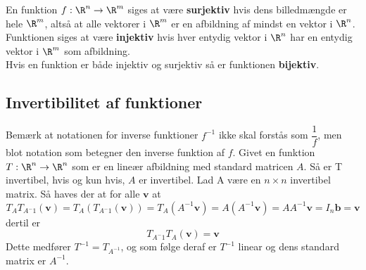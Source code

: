 
\begin{defn}{}{}
En funktion $f:\R^n \rightarrow \R^m$ siges at være \textbf{surjektiv} hvis dens billedmængde er hele $\R^m$, altså at alle vektorer i $\R^m$ er en afbildning af mindst en vektor i $\R^n$.\\
Funktionen siges at være \textbf{injektiv} hvis hver entydig vektor i $\R^n$ har en entydig vektor i $\R^m$ som afbildning.\\
Hvis en funktion er både injektiv og surjektiv så er funktionen \textbf{bijektiv}.
\end{defn}

\subsection{Invertibilitet af funktioner}

Bemærk at notationen for inverse funktioner $f^{-1}$ ikke skal forstås som $\dfrac{1}{f}$, men blot notation som betegner den inverse funktion af $f$.
Givet en funktion $T:\R^n \rightarrow \R^n$ som er en lineær afbildning med standard matricen $A$.
Så er T invertibel, hvis og kun hvis, $A$ er invertibel. Lad A være en $n \times n$ invertibel matrix. 
Så haves der at for alle $\textbf{v}$ at
$$T_AT_{A^-1}(\textbf{v})=T_A(T_{A^-1}(\textbf{v}))=T_A(A^{-1}\textbf{v})=A(A^{-1}\textbf{v})=AA^{-1}\textbf{v}=I_n\textbf{b}=\textbf{v}$$ dertil er
$$T_{A^-1}T_A(\textbf{v})=\textbf{v}$$
\noindent
Dette medfører $T^{-1}=T_{A^{-1}}$, og som følge deraf er $T^{-1}$ linear og dens standard matrix er $A^{-1}$.




